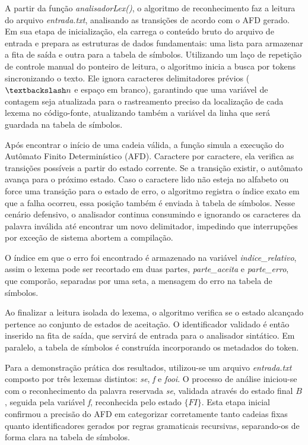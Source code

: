 \documentclass[12pt, a4paper]{article}
\begin{document}
	A partir da função \textit{analisadorLex()}, o algoritmo de reconhecimento faz a leitura do arquivo \textit{entrada.txt}, analisando as transições de acordo com o AFD gerado. Em sua etapa de inicialização, ela carrega o conteúdo bruto do arquivo de entrada e prepara as estruturas de dados fundamentais: uma lista para armazenar a fita de saída e outra para a tabela de símbolos. Utilizando um laço de repetição de controle manual do ponteiro de leitura, o algoritmo inicia a busca por tokens sincronizando o texto. Ele ignora caracteres delimitadores prévios ($\textbackslash n$ e espaço em branco), garantindo que uma variável de contagem seja atualizada para o rastreamento preciso da localização de cada lexema no código-fonte, atualizando também a variável da linha que será guardada na tabela de símbolos.

	Após encontrar o início de uma cadeia válida, a função simula a execução do Autômato Finito Determinístico (AFD). Caractere por caractere, ela verifica as transições possíveis a partir do estado corrente. Se a transição existir, o autômato avança para o próximo estado. Caso o caractere lido não esteja no alfabeto ou force uma transição para o estado de erro, o algoritmo registra o índice exato em que a falha ocorreu, essa posição também é enviada à tabela de símbolos. Nesse cenário defensivo, o analisador continua consumindo e ignorando os caracteres da palavra inválida até encontrar um novo delimitador, impedindo que interrupções por exceção de sistema abortem a compilação.

	O índice em que o erro foi encontrado é armazenado na variável \textit{indice\_relativo}, assim o lexema pode ser recortado em duas partes, \textit{parte\_aceita} e \textit{parte\_erro}, que comporão, separadas por uma seta, a mensagem do erro na tabela de símbolos.

	Ao finalizar a leitura isolada do lexema, o algoritmo verifica se o estado alcançado pertence ao conjunto de estados de aceitação. O identificador validado é então inserido na fita de saída, que servirá de entrada para o analisador sintático. Em paralelo, a tabela de símbolos é construída incorporando os metadados do token.

	Para a demonstração prática dos resultados, utilizou-se um arquivo \textit{entrada.txt} composto por três lexemas distintos: \textit{se}, \textit{f} e \textit{fooi}. O processo de análise iniciou-se com o reconhecimento da palavra reservada \textit{se}, validada através do estado final $B$, seguida pela variável \textit{f}, reconhecida pelo estado $\{FI\}$. Esta etapa inicial confirmou a precisão do AFD em categorizar corretamente tanto cadeias fixas quanto identificadores gerados por regras gramaticais recursivas, separando-os de forma clara na tabela de símbolos.
\end{document}
